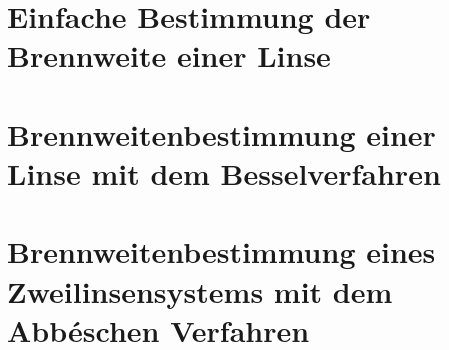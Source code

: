    \section{Einfache Bestimmung der Brennweite einer Linse}
    \section{Brennweitenbestimmung einer Linse mit dem Besselverfahren}
    \section{Brennweitenbestimmung eines Zweilinsensystems mit dem Abbéschen Verfahren}